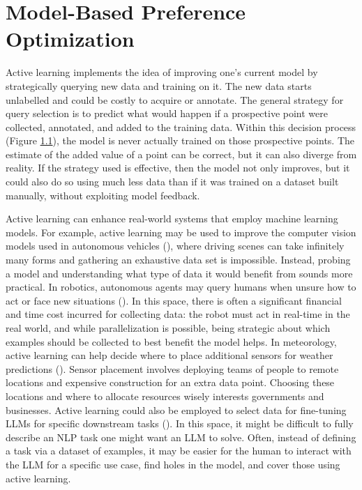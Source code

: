 \documentclass[
  letterpaper,
  DIV=11,
  numbers=noendperiod,
  oneside]{scrreprt}
\let\oldchapter\chapter
\def\chapter{%
  \setcounter{sidenote}{1}%
  \oldchapter
}
\theoremstyle{remark}
\begin{document}

\chapter{Model-Based Preference
Optimization}\label{model-based-preference-optimization}

Active learning implements the idea of improving one's current model by
strategically querying new data and training on it. The new data starts
unlabelled and could be costly to acquire or annotate. The general
strategy for query selection is to predict what would happen if a
prospective point were collected, annotated, and added to the training
data. Within this decision process (Figure \hyperref[fig:schema]{1.1}),
the model is never actually trained on those prospective points. The
estimate of the added value of a point can be correct, but it can also
diverge from reality. If the strategy used is effective, then the model
not only improves, but it could also do so using much less data than if
it was trained on a dataset built manually, without exploiting model
feedback.

Active learning can enhance real-world systems that employ machine
learning models. For example, active learning may be used to improve the
computer vision models used in autonomous vehicles
(), where driving
scenes can take infinitely many forms and gathering an exhaustive data
set is impossible. Instead, probing a model and understanding what type
of data it would benefit from sounds more practical. In robotics,
autonomous agents may query humans when unsure how to act or face new
situations (). In this space, there is often a significant financial and time
cost incurred for collecting data: the robot must act in real-time in
the real world, and while parallelization is possible, being strategic
about which examples should be collected to best benefit the model
helps. In meteorology, active learning can help decide where to place
additional sensors for weather predictions
().
Sensor placement involves deploying teams of people to remote locations
and expensive construction for an extra data point. Choosing these
locations and where to allocate resources wisely interests governments
and businesses. Active learning could also be employed to select data
for fine-tuning LLMs for specific downstream tasks
(). In this space, it
might be difficult to fully describe an NLP task one might want an LLM
to solve. Often, instead of defining a task via a dataset of examples,
it may be easier for the human to interact with the LLM for a specific
use case, find holes in the model, and cover those using active
learning.
\end{document}
